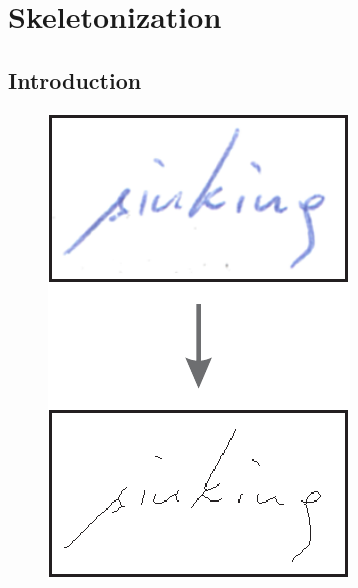 \chapter{Skeletonization}\label{chapter:skeletonization}

\section{Introduction}
\begin{figure}
  \vspace{-15pt}
  \raggedleft
  \begin{minipage}{0.20\textwidth}
    \centering
    \includegraphics[width=\textwidth]{../assets/showcase/pipeline_skeletonization.pdf}
    \caption[Skeletonization]{}
    \vspace{5pt}
    \label{fig:skeletonizationStage}
  \end{minipage}%
\end{figure}

